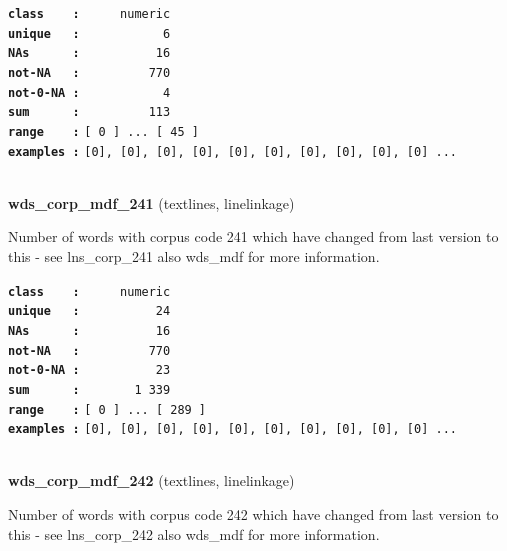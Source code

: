\documentclass[]{article}
\begin{document}
\textbf{\texttt{class\ \ \ \ :}} \texttt{~~~~~numeric}\\
\textbf{\texttt{unique\ \ \ :}} \texttt{~~~~~~~~~~~6}\\
\textbf{\texttt{NAs\ \ \ \ \ \ :}} \texttt{~~~~~~~~~~16}\\
\textbf{\texttt{not-NA\ \ \ :}} \texttt{~~~~~~~~~770}\\
\textbf{\texttt{not-0-NA\ :}} \texttt{~~~~~~~~~~~4}\\
\textbf{\texttt{sum\ \ \ \ \ \ :}} \texttt{~~~~~~~~~113}\\
\textbf{\texttt{range\ \ \ \ :}}
\texttt{{[}\ 0\ {]}\ ...\ {[}\ 45\ {]}}\\
\textbf{\texttt{examples\ :}}
\texttt{{[}0{]},\ {[}0{]},\ {[}0{]},\ {[}0{]},\ {[}0{]},\ {[}0{]},\ {[}0{]},\ {[}0{]},\ {[}0{]},\ {[}0{]}\ ...}\\

~

\textbf{wds\_corp\_mdf\_241} (textlines, linelinkage)

Number of words with corpus code 241 which have changed from last
version to this - see lns\_corp\_241 also wds\_mdf for more information.

\textbf{\texttt{class\ \ \ \ :}} \texttt{~~~~~numeric}\\
\textbf{\texttt{unique\ \ \ :}} \texttt{~~~~~~~~~~24}\\
\textbf{\texttt{NAs\ \ \ \ \ \ :}} \texttt{~~~~~~~~~~16}\\
\textbf{\texttt{not-NA\ \ \ :}} \texttt{~~~~~~~~~770}\\
\textbf{\texttt{not-0-NA\ :}} \texttt{~~~~~~~~~~23}\\
\textbf{\texttt{sum\ \ \ \ \ \ :}} \texttt{~~~~~~~1~339}\\
\textbf{\texttt{range\ \ \ \ :}}
\texttt{{[}\ 0\ {]}\ ...\ {[}\ 289\ {]}}\\
\textbf{\texttt{examples\ :}}
\texttt{{[}0{]},\ {[}0{]},\ {[}0{]},\ {[}0{]},\ {[}0{]},\ {[}0{]},\ {[}0{]},\ {[}0{]},\ {[}0{]},\ {[}0{]}\ ...}\\

~

\textbf{wds\_corp\_mdf\_242} (textlines, linelinkage)

Number of words with corpus code 242 which have changed from last
version to this - see lns\_corp\_242 also wds\_mdf for more information.
\end{document}

